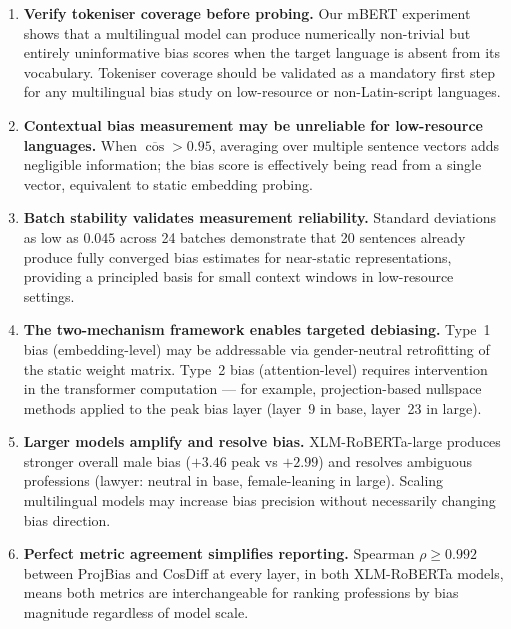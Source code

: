 \documentclass[11pt,a4paper]{article}
\begin{document}
\begin{enumerate}
  \item \textbf{Verify tokeniser coverage before probing.} Our mBERT
    experiment shows that a multilingual model can produce numerically
    non-trivial but entirely uninformative bias scores when the target language
    is absent from its vocabulary. Tokeniser coverage should be validated as a
    mandatory first step for any multilingual bias study on low-resource or
    non-Latin-script languages.

  \item \textbf{Contextual bias measurement may be unreliable for low-resource
    languages.} When $\overline{\cos} > 0.95$, averaging over multiple sentence
    vectors adds negligible information; the bias score is effectively being read
    from a single vector, equivalent to static embedding probing.

  \item \textbf{Batch stability validates measurement reliability.} Standard
    deviations as low as $0.045$ across 24 batches demonstrate that 20
    sentences already produce fully converged bias estimates for near-static
    representations, providing a principled basis for small context windows in
    low-resource settings.

  \item \textbf{The two-mechanism framework enables targeted debiasing.}
    Type~1 bias (embedding-level) may be addressable via gender-neutral
    retrofitting of the static weight matrix. Type~2 bias (attention-level)
    requires intervention in the transformer computation — for example,
    projection-based nullspace methods applied to the peak bias layer (layer~9
    in base, layer~23 in large).

  \item \textbf{Larger models amplify and resolve bias.} XLM-RoBERTa-large
    produces stronger overall male bias ($+3.46$ peak vs $+2.99$) and resolves
    ambiguous professions (lawyer: neutral in base, female-leaning in large).
    Scaling multilingual models may increase bias precision without necessarily
    changing bias direction.

  \item \textbf{Perfect metric agreement simplifies reporting.} Spearman
    $\rho \geq 0.992$ between ProjBias and CosDiff at every layer, in both
    XLM-RoBERTa models, means both metrics are interchangeable for ranking
    professions by bias magnitude regardless of model scale.
\end{enumerate}
\end{document}
